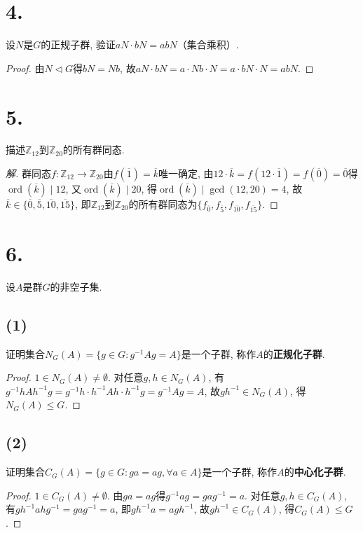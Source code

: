\documentclass[12pt, a4paper, fontset=windows]{ctexart}
\newcommand{\Z}{\mathbb{Z}}
\newcommand{\cl}[1]{\overline{#1}} %
\newcommand{\kh}[1]{（{#1}）} %
\newcommand{\ord}{\operatorname{ord}}
\newenvironment{solution}{\begin{proof}[解]}{\end{proof}}
\begin{document}
\section*{4.}

设$N$是$G$的正规子群, 验证$aN\cdot bN=abN$\kh{集合乘积}. 

\begin{proof}
由$N\lhd G$得$bN=Nb$, 故$aN\cdot bN=a\cdot Nb\cdot N=a\cdot bN\cdot N=abN$. 
\end{proof}

\section*{5.}

描述$\Z_{12}$到$\Z_{20}$的所有群同态. 

\begin{solution}
群同态$f:\Z_{12}\to\Z_{20}$由$f(\cl{1})=\cl{k}$唯一确定, 
由$12\cdot\cl{k}=f(12\cdot\cl{1})=f(\cl{0})=\cl{0}$得$\ord(\cl{k})\mid 12$, 
又$\ord(\cl{k})\mid 20$, 得$\ord(\cl{k})\mid\gcd(12,20)=4$, 
故$\cl{k}\in\{\cl{0},\cl{5},\cl{10},\cl{15}\}$, 
即$\Z_{12}$到$\Z_{20}$的所有群同态为$\{f_{\cl{0}},f_{\cl{5}},f_{\cl{10}},f_{\cl{15}}\}$. 
\end{solution}

\section*{6.}

设$A$是群$G$的非空子集. 

\subsection*{(1)}

证明集合$N_G(A)=\{g\in G:g^{-1}Ag=A\}$是一个子群, 称作$A$的{\bf 正规化子群}. 

\begin{proof}
$1\in N_G(A)\ne\emptyset$. 对任意$g,h\in N_G(A)$, 有
$g^{-1}hAh^{-1}g=g^{-1}h\cdot h^{-1}Ah\cdot h^{-1}g=g^{-1}Ag=A$, 
故$gh^{-1}\in N_G(A)$, 得$N_G(A)\le G$. 
\end{proof}

\subsection*{(2)}

证明集合$C_G(A)=\{g\in G:ga=ag,\forall a\in A\}$是一个子群, 
称作$A$的{\bf 中心化子群}. 

\begin{proof}
$1\in C_G(A)\ne\emptyset$. 由$ga=ag$得$g^{-1}ag=gag^{-1}=a$. 
对任意$g,h\in C_G(A)$, 有$gh^{-1}ahg^{-1}=gag^{-1}=a$, 
即$gh^{-1}a=agh^{-1}$, 故$gh^{-1}\in C_G(A)$, 得$C_G(A)\le G$. 
\end{proof}
\end{document}
